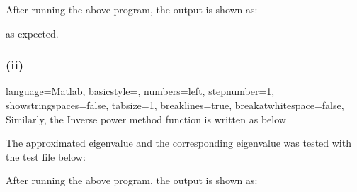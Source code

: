 \documentclass[10pt,a4paper]{article}
\numberwithin{equation}{section}
\begin{document}
	\noindent After running the above program, the output is shown as:
	
	
	
	\noindent as expected.
	
	
	\newcommand{\fourones}{\begin{bmatrix}
					1 \\
					1\\
					1\\
					1
			\end{bmatrix}}
			
	\newcommand{\Ay}{\begin{bmatrix}
					-2.7\\
					6.9\\
					2\\
					-9.6 
					\end{bmatrix}}
					
	\newcommand{\Ayone}{\begin{bmatrix}
								-0.28128\\
								0.71375\\
								0.20833\\
								-1
						\end{bmatrix}}
						
	\newcommand{\A}{\begin{bmatrix}
			-3.9 & 0.1 & 0.5 & 0.6\\
			0.1 & 7.2 & 0.1 & -0.5\\
			0.5 & 0.1 & 1.1 & 0.3\\
			0.6 & -0.5 & 0.3 & -10 
			\end{bmatrix}}
			
	\subsubsection*{(ii)}
	
	\lstset
		{ %
		    language=Matlab,
		    basicstyle=\footnotesize,
		    numbers=left,
		    stepnumber=1,
		    showstringspaces=false,
		    tabsize=1,
		    breaklines=true,
		    breakatwhitespace=false,
		}
		Similarly, the Inverse power method function is written as below
	
		
		
		\noindent The approximated eigenvalue and the corresponding eigenvalue was tested with the test file below:
		
		
		\noindent After running the above program, the output is shown as:
		
\end{document}
